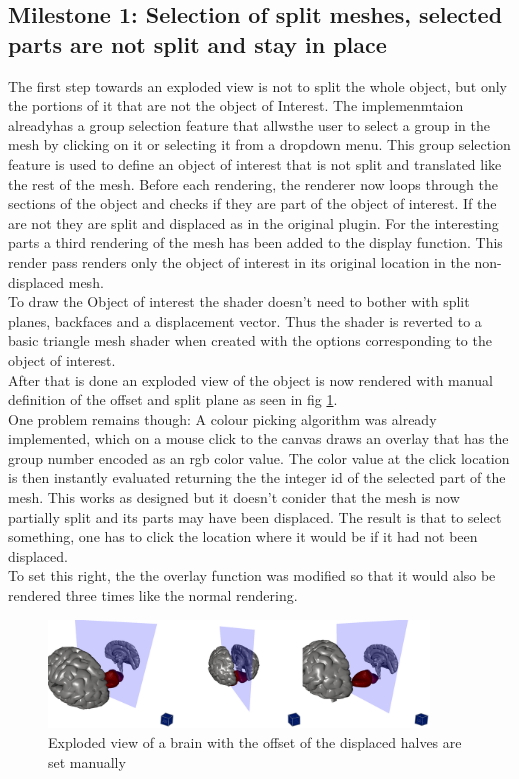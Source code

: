\subsection{Milestone 1: Selection of split meshes, selected parts are not split and stay in place} 
The first step towards an exploded view is not to split the whole object, but only the portions of it that are not the object of Interest. The implemenmtaion alreadyhas a group selection feature that allwsthe user to select a group in the mesh by clicking on it or selecting it from a dropdown menu. This group selection feature is used to define an object of interest that is not split and translated like the rest of the mesh. Before each rendering, the renderer now loops through the sections of the object and checks if they are part of the object  of interest. If the are not they are split and displaced as in the original plugin. For the interesting parts a third rendering of the mesh has been added to the display function. This render pass renders only the object of interest in its original location in the non-displaced mesh.\\
To draw the Object of interest the shader doesn't need to bother with split planes, backfaces and a displacement vector. Thus the shader is reverted to a basic triangle mesh shader when created with the options corresponding to the object of interest.\\
After that is done an exploded view of the object is now rendered with manual definition of the offset and split plane as seen in fig \ref{fig:cerebellum}. \\
One problem remains though: A colour picking algorithm was already implemented, which on a mouse click to the canvas draws an overlay that has the group number encoded as an rgb color value. The color value at the click location is then instantly evaluated returning the the integer id of the selected part of the mesh. This works as designed but it doesn't conider that the mesh is now partially split and its parts may have been displaced. The result is that to select something, one has to click the location where it would be if it had not been displaced.\\
To set this right, the the overlay function was modified so that it would also be rendered three times like the normal rendering.
\begin{figure}[tb]
	\centering
	\includegraphics[width=0.9\textwidth]{chapters/figures/cerebellum}
	\caption{Exploded view of a brain with the offset of the displaced halves are set manually}
	\label{fig:cerebellum}
\end{figure}

